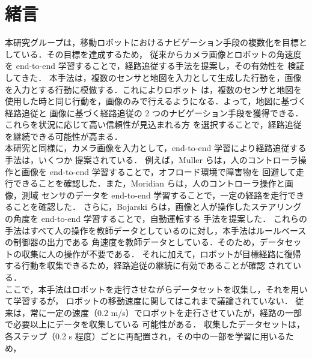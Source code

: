 \documentclass{jarticle}
\begin{document}
\date{} %

\maketitle
\thispagestyle{empty}
\pagestyle{empty}

\small
\section{緒言\protect\\}
本研究グループは，移動ロボットにおけるナビゲーション手段の複数化を目標としている．その目標を達成するため，
従来からカメラ画像とロボットの角速度を end-to-end 学習することで，経路追従する手法を提案し，その有効性を
検証してきた\cite{okada}\cite{okada2}\cite{kiyooka}．
本手法は，複数のセンサと地図を入力として生成した行動を，画像を入力とする行動に模倣する．これによりロボット
は，複数のセンサと地図を使用した時と同じ行動を，画像のみで行えるようになる．よって，地図に基づく経路追従と
画像に基づく経路追従の 2 つのナビゲーション手段を獲得できる．これらを状況に応じて高い信頼性が見込まれる方
を選択することで，経路追従を継続できる可能性が高まる．\\
\hspace*{1zw}本研究と同様に，カメラ画像を入力として，end-to-end 学習により経路追従する手法は，いくつか
提案されている．
例えば，Muller らは，人のコントローラ操作と画像を end-to-end 学習することで，オフロード環境で障害物を
回避して走行できることを確認した\cite{off_load}．また，Moridian らは，人のコントローラ操作と画像，測域
センサのデータを end-to-end 学習することで，一定の経路を走行できることを確認した\cite{Moridian}．
さらに，Bojarski らは，画像と人が操作したステアリングの角度を end-to-end 学習することで，自動運転する
手法を提案した\cite{Bojarski}．
これらの手法はすべて人の操作を教師データとしているのに対し，本手法はルールベースの制御器の出力である
角速度を教師データとしている．そのため，データセットの収集に人の操作が不要である．
それに加えて，ロボットが目標経路に復帰する行動を収集できるため，経路追従の継続に有効であることが確認
されている\cite{imai}．\\
\hspace*{1zw}ここで，本手法はロボットを走行させながらデータセットを収集し，それを用いて学習するが，
ロボットの移動速度に関してはこれまで議論されていない．
従来は，常に一定の速度（0.2 m/s）でロボットを走行させていたが，経路の一部で必要以上にデータを収集している
可能性がある．
収集したデータセットは，各ステップ（0.2 s 程度）ごとに再配置され，その中の一部を学習に用いるため，
\end{document}
